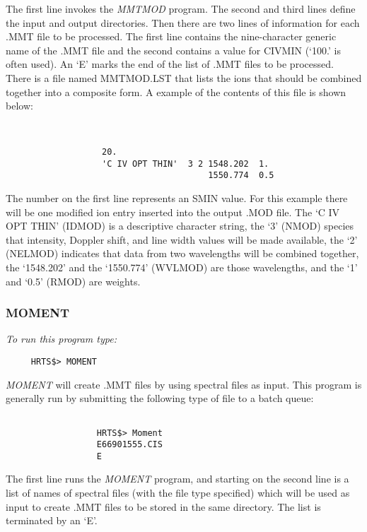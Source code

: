       The first line invokes the {\em MMTMOD} program.  The second and third
   lines define the input and output directories.  Then there are two
   lines of information for each .MMT file to be processed.  The first
   line contains the nine-character generic name of the .MMT file and the
   second contains a value for CIVMIN (`100.' is often used).
   An `E' marks the end of the list of .MMT files to be processed.
      There is a file named MMTMOD.LST  that lists
   the ions that should be combined together into a composite form.  A
   example of the contents of this file is shown below:
\begin{center}   
\begin{verbatim}


                   20.                                
                   'C IV OPT THIN'  3 2 1548.202  1.  
                                        1550.774  0.5 

\end{verbatim}   
\end{center}
   The number on the first line represents an SMIN value. For this
   example there will be one modified ion entry inserted into the output
   .MOD file.  The `C IV OPT THIN' (IDMOD) is a descriptive character
   string, the `3' (NMOD) species that intensity, Doppler shift, and line
   width values will be made available, the `2' (NELMOD) indicates that
   data from two wavelengths will be combined together, the `1548.202' and
   the `1550.774' (WVLMOD) are those wavelengths, and the `1' and `0.5'
   (RMOD) are weights.

\subsubsection{MOMENT} 

{\em To run this program type:}
\begin{verbatim}   
     HRTS$> MOMENT                  
\end{verbatim}
      {\em MOMENT} will create .MMT files by using spectral files as input.
   This program is generally run by submitting the following type of 
   file to a batch queue:
\begin{center}   
\begin{verbatim} 

                  HRTS$> Moment                              
                  E66901555.CIS                      
                  E                                   

\end{verbatim}  
\end{center}
      The first line runs the {\em MOMENT} program, and starting on the second
   line is a list of names of spectral files (with the file type
   specified) which will be used as input to create .MMT files to be
   stored in the same directory.  The list is terminated by an `E'.

